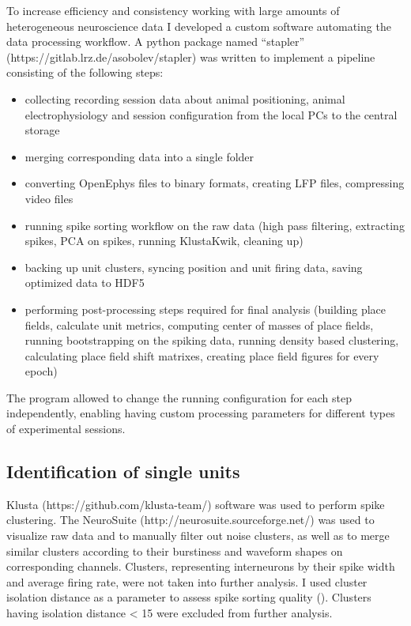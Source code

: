 To increase efficiency and consistency working with large amounts of heterogeneous neuroscience data I developed a custom software automating the data processing workflow. A python package named “stapler” (https://gitlab.lrz.de/asobolev/stapler) was written to implement a pipeline consisting of the following steps:
\begin{itemize}
    \item collecting recording session data about animal positioning, animal electrophysiology and session configuration from the local PCs to the central storage
    \item merging corresponding data into a single folder
    \item converting OpenEphys files to binary formats, creating LFP files, compressing video files
    \item running spike sorting workflow on the raw data (high pass filtering, extracting spikes, PCA on spikes, running KlustaKwik, cleaning up)
    \item backing up unit clusters, syncing position and unit firing data, saving optimized data to HDF5
    \item performing post-processing steps required for final analysis (building place fields, calculate unit metrics, computing center of masses of place fields, running bootstrapping on the spiking data, running density based clustering, calculating place field shift matrixes, creating place field figures for every epoch)
\end{itemize}

The program allowed to change the running configuration for each step independently, enabling having custom processing parameters for different types of experimental sessions.


\subsection{Identification of single units}

Klusta (https://github.com/klusta-team/) software was used to perform spike clustering. The NeuroSuite (http://neurosuite.sourceforge.net/) was used to visualize raw data and to manually filter out noise clusters, as well as to merge similar clusters according to their burstiness and waveform shapes on corresponding channels. Clusters, representing interneurons by their spike width and average firing rate, were not taken into further analysis.
I used cluster isolation distance as a parameter to assess spike sorting quality (\cite{SCHMITZERTORBERT20051}). Clusters having isolation distance < 15 were excluded from further analysis.


